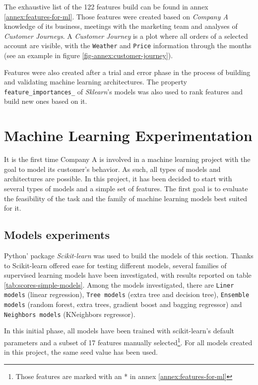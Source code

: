 The exhaustive list of the 122 features build can be found in annex \ref{annex:features-for-ml}. Those features were created based on \textit{Company A} knowledge of its business, meetings with the marketing team and analyses of \textit{Customer Journeys}. A \textit{Customer Journey} is a plot where all orders of a selected account are visible, with the \texttt{Weather} and \texttt{Price} information through the months (see an example in figure \ref{fig-annex:customer-journey}). 

Features were also created after a trial and error phase in the process of building and validating machine learning architectures. The property \texttt{feature\_importances\_} of \textit{Sklearn}'s models was also used to rank features and build new ones based on it.



\section{Machine Learning Experimentation} \label{sec:ml-experimentation}

It is the first time Company A is involved in a machine learning project with the goal to model its customer's behavior. As such, all types of models and architectures are possible. In this project, it has been decided to start with several types of models and a simple set of features. The first goal is to evaluate the feasibility of the task and the family of machine learning models best suited for it. 


\subsection{Models experiments}
Python' package \textit{Scikit-learn} was used to build the models of this section. Thanks to Scikit-learn offered ease for testing different models, several families of supervised learning models have been investigated, with results reported on table \ref{tab:scores-simple-models}. Among the models investigated, there are \texttt{Liner models} (linear regression), \texttt{Tree models} (extra tree and decision tree), \texttt{Ensemble models} (random forest, extra trees, gradient boost and bagging regressor) and \texttt{Neighbors models} (KNeighbors regressor).

In this initial phase, all models have been trained with scikit-learn's default parameters and a subset of 17 features manually selected\footnote{Those features are marked with an * in annex \ref{annex:features-for-ml}}. For all models created in this project, the same seed value has been used.

